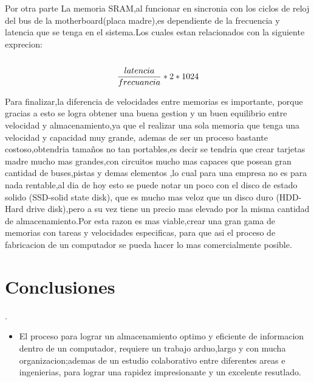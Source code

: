 \documentclass{article}
\begin{document}
Por otra parte La memoria SRAM,al funcionar en sincronia con los ciclos de reloj del bus de la motherboard(placa madre),es dependiente de la frecuencia y latencia que se tenga en el sistema.Los cuales estan relacionados con la siguiente exprecion:\\\\

\[
\frac{latencia}{frecuancia}*2*1024 \\\\
\]

Para finalizar,la diferencia de velocidades entre memorias es importante, porque gracias a esto se logra obtener una buena gestion y un buen equilibrio entre velocidad y almacenamiento,ya que el realizar una sola memoria que tenga una velocidad y capacidad muy grande, ademas de ser un proceso bastante costoso,obtendria tamaños no tan portables,es decir se tendria que crear tarjetas madre mucho mas grandes,con circuitos mucho mas capaces que posean gran cantidad de buses,pistas y demas elementos ,lo cual para una empresa no es para nada rentable,al dia de hoy esto se puede notar un poco con el disco de estado solido (SSD-solid state disk), que es mucho mas veloz que un disco duro (HDD-Hard drive disk),pero a su vez tiene un precio mas elevado por la misma cantidad de almacenamiento.Por esta razon es mas viable,crear una gran gama de memorias con tareas y velocidades especificas, para que asi el proceso de fabricacion de un computador se pueda hacer lo mas comercialmente posible.


\section{Conclusiones}.\label{conclusiones}
\begin{itemize}
    \item El proceso para lograr un almacenamiento optimo y eficiente de informacion dentro de un computador, requiere un trabajo arduo,largo y con mucha organizacion;ademas de un estudio colaborativo entre diferentes areas e ingenierias, para lograr una rapidez impresionante y un excelente resutlado.
\end{itemize}

\newpage


\end{document}
